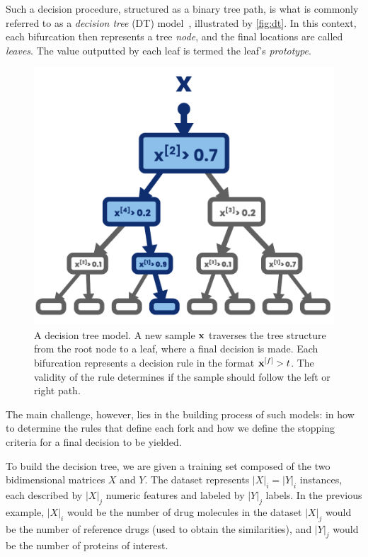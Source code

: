 Such a decision procedure, structured as a binary tree path, is what is commonly referred to as a \emph{decision tree} (DT) model~\cite{breiman1984classification}, illustrated by \autoref{fig:dt}. 
In this context, each bifurcation then represents a tree \emph{node}, and the final locations are called \emph{leaves}. The value outputted by each leaf is termed the leaf's \emph{prototype}.
%

\begin{figure}
    \centering
    \includegraphics[width=.5\textwidth]{figures/decision_tree.pdf}
    \caption{A decision tree model. A new sample $\mathbf{x}$ traverses the tree structure from the root node to a leaf, where a final decision is made. Each bifurcation represents a decision rule in the format $\mathbf{x}^{[f]} > t$. The validity of the rule determines if the sample should follow the left or right path.}
    \label{fig:dt}
\end{figure}

The main challenge, however, lies in the building process of such models: in how to determine the rules that define each fork and how we define the stopping criteria for a final decision to be yielded.

To build the decision tree, we are given a training set composed of the two bidimensional matrices $X$ and $Y$. The dataset represents $|X|_i = |Y|_i$ instances, each described by $|X|_j$ numeric features and labeled by $|Y|_j$ labels.
In the previous example, $|X|_i$ would be the number of drug molecules in the dataset
$|X|_j$ would be the number of reference drugs (used to obtain the similarities), and $|Y|_j$ would be the number of proteins of interest.

